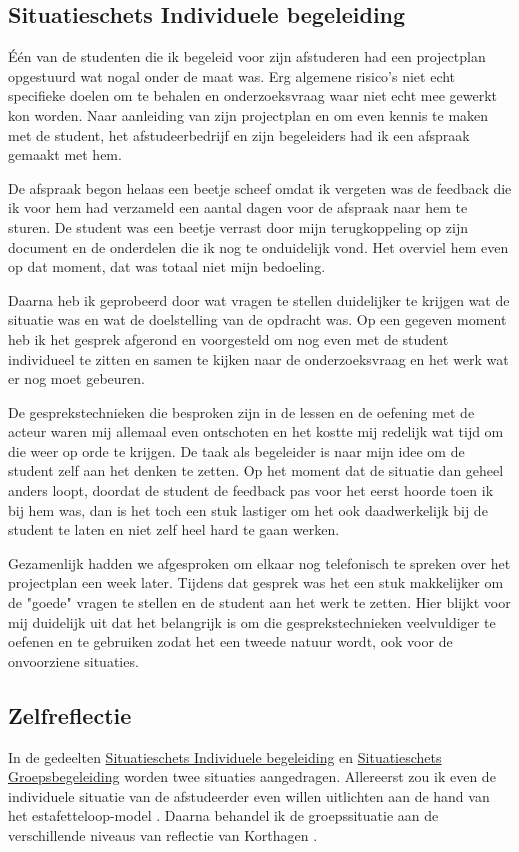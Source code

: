 \subsection{Situatieschets Individuele begeleiding}
\label{sec:individu}
Één van de studenten die ik begeleid voor zijn afstuderen had een projectplan opgestuurd wat nogal onder de maat was. Erg algemene risico's niet echt specifieke doelen om te behalen en onderzoeksvraag waar niet echt mee gewerkt kon worden. Naar aanleiding van zijn projectplan en om even kennis te maken met de student, het afstudeerbedrijf en zijn begeleiders had ik een afspraak gemaakt met hem.

De afspraak begon helaas een beetje scheef omdat ik vergeten was de feedback die ik voor hem had verzameld een aantal dagen voor de afspraak naar hem te sturen. De student was een beetje verrast door mijn terugkoppeling op zijn document en de onderdelen die ik nog te onduidelijk vond. Het overviel hem even op dat moment, dat was totaal niet mijn bedoeling. 

Daarna heb ik geprobeerd door wat vragen te stellen duidelijker te krijgen wat de situatie was en wat de doelstelling van de opdracht was. Op een gegeven moment heb ik het gesprek afgerond en voorgesteld om nog even met de student individueel te zitten en samen te kijken naar de onderzoeksvraag en het werk wat er nog moet gebeuren.

De gesprekstechnieken die besproken zijn in de lessen en de oefening met de acteur waren mij allemaal even ontschoten en het kostte mij redelijk wat tijd om die weer op orde te krijgen. De taak als begeleider is naar mijn idee om de student zelf aan het denken te zetten. Op het moment dat de situatie dan geheel anders loopt, doordat de student de feedback pas voor het eerst hoorde toen ik bij hem was, dan is het toch een stuk lastiger om het ook daadwerkelijk bij de student te laten en niet zelf heel hard te gaan werken. 

Gezamenlijk hadden we afgesproken om elkaar nog telefonisch te spreken over het projectplan een week later. Tijdens dat gesprek was het een stuk makkelijker om de "goede" vragen te stellen en de student aan het werk te zetten. Hier blijkt voor mij duidelijk uit dat het belangrijk is om die gesprekstechnieken veelvuldiger te oefenen en te gebruiken zodat het een tweede natuur wordt, ook voor de onvoorziene situaties.

\subsection{Zelfreflectie}
In de gedeelten \hyperref[sec:groep]{Situatieschets Individuele begeleiding} en \hyperref[sec:individu]{Situatieschets Groepsbegeleiding} worden twee situaties aangedragen. Allereerst zou ik even de individuele situatie van de afstudeerder even willen uitlichten aan de hand van het estafetteloop-model \cite{methorstkaders}. Daarna behandel ik de groepssituatie aan de verschillende niveaus van reflectie van Korthagen \cite{korthagen2002niveaus}.

